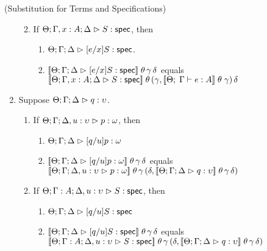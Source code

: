 \begin{lemma*}{(Substitution for Terms and Specifications)}
\begin{enumerate}
\begin{enumerate}
\begin{enumerate}
        \end{enumerate}
  \item If $\judgeS[\Theta; \Gamma, x:A; \Delta]{S}$, 
        then 
        \begin{enumerate}
        \item $\judgeS[\Theta; \Gamma; \Delta]{[e/x]S}$.
        \item $\interp{\judgeS[\Theta; \Gamma; \Delta]{[e/x]S}}\;\theta\,\gamma\,\delta$ equals \\
              $\interp{\judgeS[\Theta; \Gamma, x:A; \Delta]{S}}\;\theta\,(\gamma, \interp{\judgeE{\Gamma}{e}{A}}\;\theta\;\gamma)\,\delta$
        \end{enumerate}
  \end{enumerate}
\item Suppose $\judgeA{q}{\upsilon}$.
  \begin{enumerate}
  \item If $\judgeA[\Theta; \Gamma; \Delta, u:\upsilon]{p}{\omega}$, 
        then 
        \begin{enumerate}
          \item $\judgeA[\Theta; \Gamma; \Delta]{[q/u]p}{\omega}$
          \item $\interp{\judgeA[\Theta; \Gamma; \Delta]{[q/u]p}{\omega}}\;\theta\,\gamma\,\delta$ equals \\
                $\interp{\judgeA[\Theta; \Gamma; \Delta, u:\upsilon]{p}{\omega}}\;\theta\,\gamma\,(\delta, \interp{\judgeA{q}{\upsilon}}\;\theta\,\gamma\,\delta)$
        \end{enumerate}
      \item If $\judgeS[\Theta; \Gamma:A; \Delta, u:\upsilon]{S}$, 
        then 
        \begin{enumerate}
          \item $\judgeS[\Theta; \Gamma; \Delta]{[q/u]S}$ 
          \item $\interp{\judgeS[\Theta; \Gamma; \Delta]{[q/u]S}}\;\theta\,\gamma\,\delta$ equals \\
                $\interp{\judgeS[\Theta; \Gamma:A; \Delta, u:\upsilon]{S}}\;\theta\,\gamma\,(\delta, \interp{\judgeA{q}{\upsilon}}\;\theta\,\gamma\,\delta)$
        \end{enumerate}
  \end{enumerate}

\end{enumerate}
\end{lemma*}
